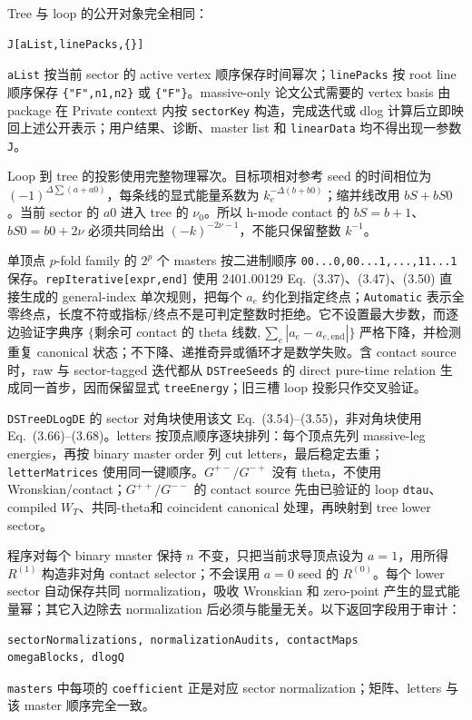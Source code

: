 ﻿\documentclass[a4paper,11pt]{article}
\begin{document}
Tree 与 loop 的公开对象完全相同：
\begin{verbatim}
J[aList,linePacks,{}]
\end{verbatim}
\texttt{aList} 按当前 sector 的 active vertex 顺序保存时间幂次；\texttt{linePacks} 按 root line 顺序保存
\texttt{\{"F",n1,n2\}} 或 \texttt{\{"F"\}}。massive-only 论文公式需要的 vertex basis 由 package
在 Private context 内按 \texttt{sectorKey} 构造，完成迭代或 dlog 计算后立即映回上述公开表示；用户结果、诊断、master list 和 \texttt{linearData} 均不得出现一参数 \texttt{J}。

Loop 到 tree 的投影使用完整物理幂次。目标项相对参考 seed 的时间相位为 $(-1)^{\Delta\sum(a+a0)}$，每条线的显式能量系数为 $k_e^{-\Delta(b+b0)}$；缩并线改用 $bS+bS0$。当前 sector 的 $a0$ 进入 tree 的 $\nu_0$。所以 h-mode contact 的 $bS=b+1$、$bS0=b0+2\nu$ 必须共同给出 $(-k)^{-2\nu-1}$，不能只保留整数 $k^{-1}$。

单顶点 $p$-fold family 的 $2^p$ 个 masters 按二进制顺序 \texttt{00...0,00...1,...,11...1} 保存。\texttt{repIterative[expr,end]} 使用 2401.00129 Eq.~(3.37)、(3.47)、(3.50) 直接生成的 general-index 单次规则，把每个 $a_e$ 约化到指定终点；\texttt{Automatic} 表示全零终点，长度不符或指标/终点不是可判定整数时拒绝。它不设置最大步数，而逐边验证字典序
$\{\text{剩余可 contact 的 theta 线数},\sum_e|a_e-a_{e,\mathrm{end}}|\}$ 严格下降，并检测重复 canonical 状态；不下降、递推奇异或循环才是数学失败。含 contact source 时，raw 与 sector-tagged 迭代都从 \texttt{DSTreeSeeds} 的 direct pure-time relation 生成同一首步，因而保留显式 \texttt{treeEnergy}；旧三槽 loop 投影只作交叉验证。

\texttt{DSTreeDLogDE} 的 sector 对角块使用该文 Eq.~(3.54)--(3.55)，非对角块使用 Eq.~(3.66)--(3.68)。letters 按顶点顺序逐块排列：每个顶点先列 massive-leg energies，再按 binary master order 列 cut letters，最后稳定去重；\texttt{letterMatrices} 使用同一键顺序。$G^{+-}/G^{-+}$ 没有 theta，不使用 Wronskian/contact；$G^{++}/G^{--}$ 的 contact source 先由已验证的 loop \texttt{dtau}、compiled $W_T$、共同-theta和 coincident canonical 处理，再映射到 tree lower sector。

程序对每个 binary master 保持 $n$ 不变，只把当前求导顶点设为 $a=1$，用所得 $R^{(1)}$ 构造非对角 contact selector；不会误用 $a=0$ seed 的 $R^{(0)}$。每个 lower sector 自动保存共同 normalization，吸收 Wronskian 和 zero-point 产生的显式能量幂；其它入边除去 normalization 后必须与能量无关。以下返回字段用于审计：
\begin{verbatim}
sectorNormalizations, normalizationAudits, contactMaps
omegaBlocks, dlogQ
\end{verbatim}
\texttt{masters} 中每项的 \texttt{coefficient} 正是对应 sector normalization；矩阵、letters 与该 master 顺序完全一致。
\end{document}
